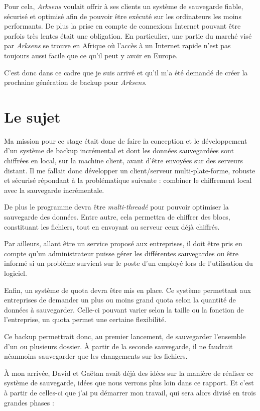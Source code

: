 \documentclass[a4paper,10pt, twoside]{report}
\begin{document}
\begin{spacing}{1.2}
Pour cela, \textit{Arksens} voulait offrir à ses clients un système de
sauvegarde fiable, sécurisé et optimisé afin de pouvoir être
exécuté sur les ordinateurs les moins performants. De plus la prise en
compte de connexions Internet pouvant être parfois très lentes était une
obligation. En particulier, une partie du marché visé par \textit{Arksens}
se trouve en Afrique où l'accès à un Internet rapide n'est pas toujours
aussi facile que ce qu'il peut y avoir en Europe.

C'est donc dans ce cadre que je suis arrivé et qu'il m'a été demandé
de créer la prochaine génération de backup pour \textit{Arksens}.

\section{Le sujet}
Ma mission pour ce stage était donc de faire la conception et le
développement d'un système de backup incrémental et dont les données
sauvegardées sont chiffrées en local, sur la machine client, avant d'être
envoyées sur des serveurs distant. Il me fallait donc développer un
client/serveur multi-plate-forme, robuste et sécurisé répondant à
la problématique suivante : combiner le chiffrement local avec la sauvegarde
incrémentale.

De plus le programme devra être \textit{multi-threadé} pour pouvoir
optimiser la sauvegarde des données. Entre autre, cela permettra de chiffrer
des blocs, constituant les fichiers, tout en envoyant au serveur ceux déjà
chiffrés.

Par ailleurs, allant être un service proposé aux entreprises, il doit être
pris en compte qu'un administrateur puisse gérer les différentes
sauvegardes ou être informé si un problème survient sur le poste d'un
employé lors de l'utilisation du logiciel.

Enfin, un système de quota devra être mis en place. Ce système permettant
aux entreprises de demander un plus ou moins grand quota selon la quantité de
données à sauvegarder. Celle-ci pouvant varier selon la taille ou la
fonction de l'entreprise, un quota permet une certaine flexibilité.

Ce backup permettrait donc, au premier lancement, de sauvegarder l'ensemble
d'un ou plusieurs dossier. À partir de la seconde sauvegarde, il ne faudrait
néanmoins sauvegarder que les changements sur les fichiers.

À mon arrivée, David et Gaëtan avait déjà des idées sur la
manière de réaliser ce système de sauvegarde, idées que nous verrons
plus loin dans ce rapport. Et c'est à partir de celles-ci que j'ai pu
démarrer mon travail, qui sera alors divisé en trois grandes phases :


\end{spacing}
\end{document}
